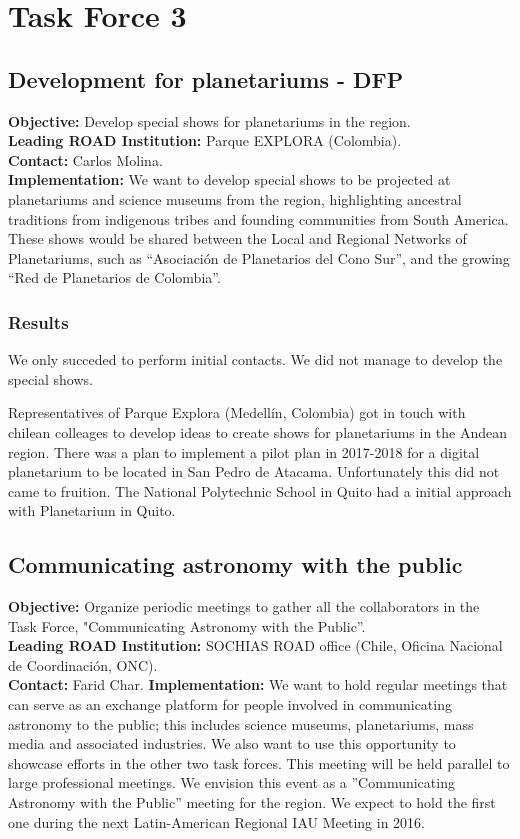 \newpage
\section{Task Force 3}
\label{chapter 4}


\subsection{Development for planetariums - DFP}
\textbf{Objective:} Develop special shows for planetariums in the region.
\\
\textbf{Leading ROAD Institution:} Parque EXPLORA (Colombia).
\\
\textbf{Contact:} Carlos Molina.
\\
\textbf{Implementation:} We want to develop special shows to be projected at planetariums and science museums from the region, highlighting ancestral traditions from indigenous tribes and founding communities from South America.
These shows would be shared between the Local and Regional Networks of Planetariums, such as “Asociación de Planetarios
del Cono Sur”, and the growing “Red de Planetarios de Colombia”.

\subsubsection{Results}

We only succeded to perform initial contacts.
We did not manage to develop the special shows.


Representatives of Parque Explora (Medellín, Colombia) got in touch with chilean colleages to develop ideas to create shows for planetariums in the Andean region. There was a plan to implement a pilot plan in 2017-2018 for a digital planetarium to be located in San Pedro de Atacama.
Unfortunately this did not came to fruition.
The National Polytechnic School in Quito had a initial approach with Planetarium in Quito. 

\subsection{Communicating astronomy with the public}
\textbf{Objective:} Organize periodic meetings to gather all the collaborators in the Task Force, "Communicating Astronomy with the Public”.
\\
\textbf{Leading ROAD Institution:} SOCHIAS ROAD office (Chile, Oficina Nacional de Coordinación, ONC).
\\
\textbf{Contact:} Farid Char.
\textbf{Implementation:} We want to hold regular meetings that can serve as an exchange platform for people involved in communicating astronomy to the public; this includes science museums, planetariums, mass media and associated industries. We also want to use this opportunity to showcase efforts in the other two task forces. This meeting will be
held parallel to large professional meetings. We envision this event as a ”Communicating Astronomy with the Public” meeting for the region. We expect to hold the first one during the next Latin-American Regional IAU Meeting in 2016.


